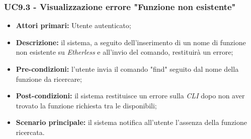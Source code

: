 \subsubsection{UC9.3 - Visualizzazione errore "Funzione non esistente"}
\begin{itemize}
	\item \textbf{Attori primari:} Utente autenticato;
	\item \textbf{Descrizione:} il sistema, a seguito dell'inserimento di un nome di funzione non esistente su \textit{Etherless} e all'invio del comando, restituirà un errore;
	\item \textbf{Pre-condizioni:} l'utente invia il comando "find" seguito dal nome della funzione da ricercare;
	\item \textbf{Post-condizioni:} il sistema restituisce un errore sulla \textit{CLI\glo} dopo non aver trovato la funzione richiesta tra le disponibili;
	\item \textbf{Scenario principale:} il sistema notifica all'utente l'assenza della funzione ricercata.
\end{itemize}
